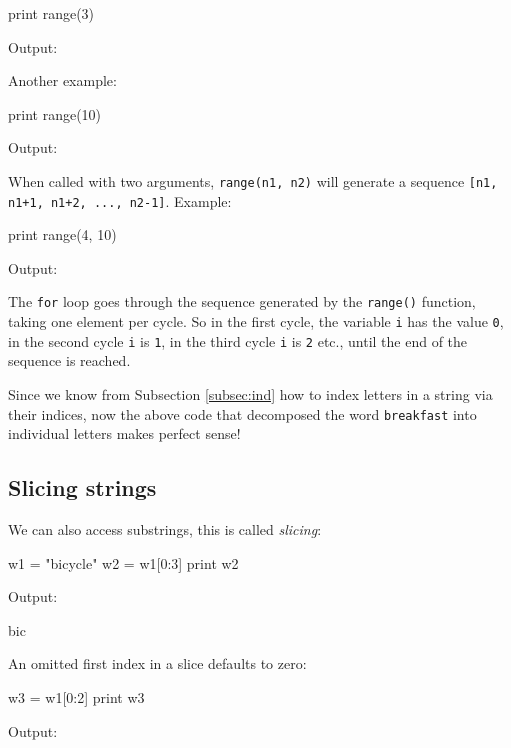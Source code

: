 \begin{bluecode}
print range(3)
\end{bluecode}
Output:

\begin{greencode}
[0, 1, 2]
\end{greencode}
Another example:

\begin{bluecode}
print range(10)
\end{bluecode}
Output:

\begin{greencode}
[0, 1, 2, 3, 4, 5, 6, 7, 8, 9]
\end{greencode}
When called with two arguments, {\tt range(n1, n2)} will generate 
a sequence {\tt [n1, n1+1, n1+2, ..., n2-1]}. Example:

\begin{bluecode}
print range(4, 10)
\end{bluecode}
Output:

\begin{greencode}
[4, 5, 6, 7, 8, 9]
\end{greencode}
The {\tt for} loop goes through the sequence generated by the {\tt range()} function, 
taking one element per cycle. So in the first cycle, the variable {\tt i}
has the value {\tt 0}, in the second cycle {\tt i} is {\tt 1}, in the third cycle 
{\tt i} is {\tt 2} etc., until the end of the sequence is reached. 

Since we know from Subsection \ref{subsec:ind} 
how to index letters in a string via their indices, now the above 
code that decomposed the word {\tt breakfast} into individual letters
makes perfect sense!

\subsection{Slicing strings}

We can also access substrings, this is called {\em slicing}:

\begin{bluecode}
w1 = "bicycle"
w2 = w1[0:3]
print w2
\end{bluecode}
Output:

\begin{greencode}
bic
\end{greencode}
An omitted first index in a slice defaults to zero:

\begin{bluecode}
w3 = w1[0:2]
print w3
\end{bluecode}
Output:

